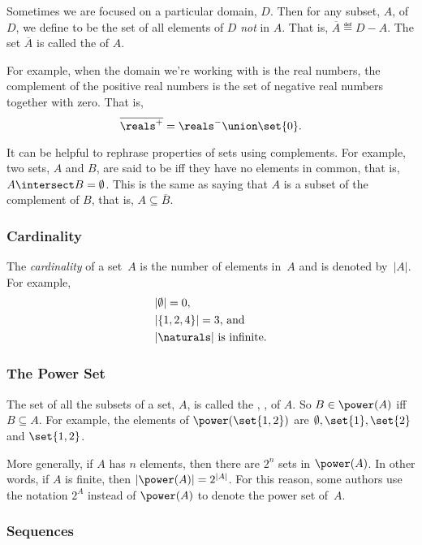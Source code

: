 Sometimes we are focused on a particular domain, $D$.  Then for any
subset, $A$, of $D$, we define  to be the set of all
elements of $D$ \emph{not} in $A$.  That is, $\overline{A} \eqdef D-A$.
The set $\overline{A}$ is called the  of $A$.

For example, when the domain we're working with is the real numbers,
the complement of the positive real numbers is the set of negative real
numbers together with zero.  That is,
\[
\overline{\reals^+} = \reals^- \union \set{0}.
\]

It can be helpful to rephrase properties of sets using complements.  For
example, two sets, $A$ and $B$, are said to be  iff they
have no elements in common, that is, $A \intersect B = \emptyset$.  This
is the same as saying that $A$ is a subset of the complement of $B$, that
is, $A \subseteq \overline{B}$.

\subsubsection{Cardinality}

The \emph{cardinality} of a set~$A$ is the number of elements in~$A$
and is denoted by~$|A|$.  For example,
\begin{align*}
    & |\emptyset| = 0, \\
    & |\{ 1, 2, 4 \}| = 3\text{, and} \\
    & |\naturals| \text{ is infinite.}
\end{align*}

\subsubsection{The Power Set}

The set of all the subsets of a set, $A$, is called the , , of $A$.  So $B \in \power(A)$ iff $B
\subseteq A$.  For example, the elements of $\power( \set{1, 2})$ are
$\emptyset, \set{1}, \set{2}$ and $\set{1, 2}$.

More generally, if $A$ has $n$ elements, then there are $2^n$ sets in
$\power(A)$.  In other words, if $A$ is finite, then $|\power(A)| =
  2^{|A|}$.  For this reason, some authors use the notation $2^A$
  instead of $\power(A)$ to denote the power set of~$A$.

\subsubsection{Sequences}

